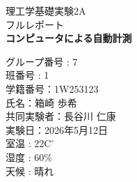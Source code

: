 \documentclass[
 paper=a4,
 fontsize=11pt, 
 head_space=30mm,
 foot_space=30mm,
 gutter=25mm,
 fore_edge=25mm
]{jlreq}
\title{\expTitle}
\author{\studentID \quad \studentName}
\date{\today}
\begin{document}
\begin{titlepage}
    \centering
    \vspace*{50mm}
    {\Large 理工学基礎実験2A} \\
    {\Large フルレポート}\\
    \vspace*{10mm}
    {\Huge \textbf{コンピュータによる自動計測}} \\
    \vspace*{90mm}
    
    \begin{flushright}
        \large
        グループ番号 : 7\\
        班番号 : 1 \\
        学籍番号：1W253123 \\
        氏名：箱崎 歩希 \\
        共同実験者：長谷川 仁康 \\
        実験日：2026年5月12日 \\
        室温 : 22$\mathrm{C^\circ}$ \\
        湿度 : 60\% \\
        天候 : 晴れ \\
    \end{flushright}
\end{titlepage}

\setcounter{page}{1}







\end{document}
